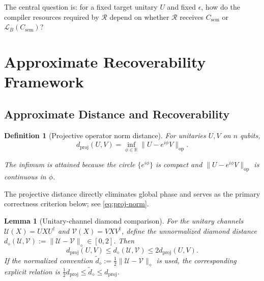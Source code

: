 \documentclass[a4paper,twocolumn,10pt,unpublished]{quantumarticle}
\newtheorem{definition}{Definition}
\newtheorem{lemma}{Lemma}
\begin{document}
The central question is: for a fixed target unitary $U$ and fixed
$\epsilon$, how do the compiler resources required by $\mathcal{R}$
depend on whether $\mathcal{R}$ receives $C_{\mathrm{sem}}$ or
$\mathcal{L}_B(C_{\mathrm{sem}})$?


\section{Approximate Recoverability Framework}
\label{sec:framework}

\subsection{Approximate Distance and Recoverability}

\begin{definition}[Projective operator norm distance]
\label{def:proj-norm}
For unitaries $U, V$ on $n$ qubits,
\begin{equation}
\label{eq:proj-norm}
  d_{\mathrm{proj}}(U, V) = \inf_{\phi \in \mathbb{R}} \|U - e^{i\phi} V\|_{\mathrm{op}}.
\end{equation}
  
The infimum is attained because the circle $\{e^{i\phi}\}$ is compact and
$\|U - e^{i\phi}V\|_{\mathrm{op}}$ is continuous in $\phi$.
\end{definition}

The projective distance directly eliminates global phase and serves as
the primary correctness criterion below; see \eqref{eq:proj-norm}.

\begin{lemma}[Unitary-channel diamond comparison]
\label{lem:diamond-comparison}
For the unitary channels
$\mathcal U(X)=UXU^\dagger$ and $\mathcal V(X)=VXV^\dagger$, define the
\emph{unnormalized} diamond distance
$d_\diamond(\mathcal U,\mathcal V)
:=\|\mathcal U-\mathcal V\|_\diamond\in[0,2]$.  Then
\begin{equation*}
 d_{\mathrm{proj}}(U,V)
 \leq d_\diamond(\mathcal U,\mathcal V)
 \leq 2d_{\mathrm{proj}}(U,V).
\end{equation*}
If the normalized convention
$\widetilde d_\diamond:=\tfrac12\|\mathcal U-\mathcal V\|_\diamond$ is used,
the corresponding explicit relation is
$\tfrac12d_{\mathrm{proj}}\leq\widetilde d_\diamond\leq
d_{\mathrm{proj}}$.
\end{lemma}
\end{document}
